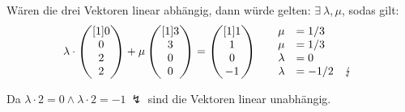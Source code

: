 \documentclass[main.tex]{subfiles}
\begin{document}
Wären die drei Vektoren linear abhängig, dann würde gelten: $\exists \ \lambda ,\mu $, sodas gilt:
\begin{equation*}
    \lambda \cdotp \begin{pmatrix}[1]
    0\\
    0\\
    2\\
    2
    \end{pmatrix} +\mu \begin{pmatrix}[1]
    3\\
    3\\
    0\\
    0
    \end{pmatrix} =\begin{pmatrix}[1]
    1\\
    1\\
    0\\
    -1
    \end{pmatrix} \ \begin{array}[1]{ r r l c }
    & \mu  & =1/3 & \\
    & \mu  & =1/3 & \\
    & \lambda  & =0 & \\
    & \lambda  & =-1/2 & \lightning 
    \end{array}
\end{equation*}

Da $\lambda \cdotp 2=0\land \lambda \cdotp 2=-1\ \lightning$ sind die Vektoren linear unabhängig. 
\end{document}
